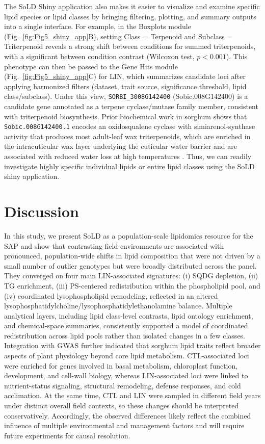 \documentclass[9pt,twocolumn,twoside]{rilabRxiv}
\begin{document}
The SoLD Shiny application also makes it easier to visualize and examine specific lipid species or lipid classes by bringing filtering, plotting, and summary outputs into a single interface. For example, in the Boxplots module (Fig.~\ref{fig:Fig5_shiny_app}B), setting Class = Terpenoid and Subclass = Triterpenoid reveals a strong shift between conditions for summed triterpenoids, with a significant between condition contrast (Wilcoxon test, $p < 0.001$). This phenotype can then be passed to the Gene Hits module (Fig.~\ref{fig:Fig5_shiny_app}C) for LIN, which summarizes candidate loci after applying harmonized filters (dataset, trait source, significance threshold, lipid class/subclass). Under this view, \texttt{SORBI\_3008G142400} (Sobic.008G142400) is a candidate gene annotated as a terpene cyclase/mutase family member, consistent with triterpenoid biosynthesis. Prior biochemical work in sorghum shows that \texttt{Sobic.008G142400.1} encodes an oxidosqualene cyclase with simiarenol-synthase activity that produces most adult-leaf wax triterpenoids, which are enriched in the intracuticular wax layer underlying the cuticular water barrier and are associated with reduced water loss at high temperatures \citep{Busta2021}. Thus, we can readily investigate highly specific individual lipids or entire lipid classes using the SoLD shiny application. 


\section{Discussion}

In this study, we present SoLD as a population-scale lipidomics resource for the SAP and show that contrasting field environments are associated with pronounced, population-wide shifts in lipid composition that were not driven by a small number of outlier genotypes but were broadly distributed across the panel. They converged on four main LIN-associated signatures: (i) SQDG depletion, (ii) TG enrichment, (iii) PS-centered redistribution within the phospholipid pool, and (iv) coordinated lysophospholipid remodeling, reflected in an altered lysophosphatidylcholine/lysophosphatidylethanolamine balance. Multiple analytical layers, including lipid class-level contrasts, lipid ontology enrichment, and chemical-space summaries, consistently supported a model of coordinated redistribution across lipid pools rather than isolated changes in a few classes. Integration with GWAS further indicated that sorghum lipid traits reflect broader aspects of plant physiology beyond core lipid metabolism. CTL-associated loci were enriched for genes involved in basal metabolism, chloroplast function, development, and cell-wall biology, whereas LIN-associated loci were linked to nutrient-status signaling, structural remodeling, defense responses, and cold acclimation. At the same time, CTL and LIN were sampled in different field years under distinct overall field contexts, so these changes should be interpreted conservatively. Accordingly, the observed differences likely reflect the combined influence of multiple environmental and management factors and will require future experiments for causal resolution.
\end{document}
